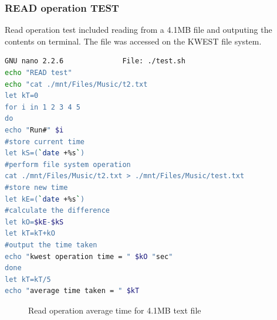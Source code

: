 \subsubsection{READ operation TEST}
Read operation test included reading from a 4.1MB file and outputing the contents on terminal. The file was accessed on the KWEST file system.
\begin{lstlisting}[language=bash,frame=single]
GNU nano 2.2.6              File: ./test.sh                                   
echo "READ test"
echo "cat ./mnt/Files/Music/t2.txt 
let kT=0
for i in 1 2 3 4 5 
do
echo "Run#" $i
#store current time
let kS=(`date +%s`)
#perform file system operation
cat ./mnt/Files/Music/t2.txt > ./mnt/Files/Music/test.txt
#store new time
let kE=(`date +%s`)
#calculate the difference
let kO=$kE-$kS
let kT=kT+kO
#output the time taken
echo "kwest operation time = " $kO "sec"
done
let kT=kT/5
echo "average time taken = " $kT
\end{lstlisting}
\begin{figure}[htb]
\centering
\setlength\fboxsep{0pt}
\setlength\fboxrule{0.5pt}
\caption{Read operation average time for 4.1MB text file}
\label{fig:dfd0}
\end{figure}

